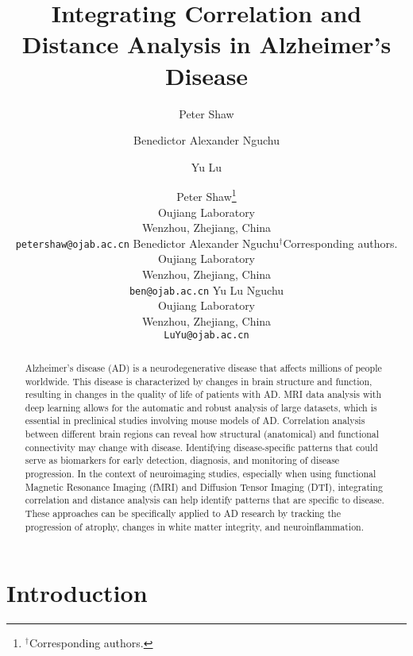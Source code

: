 \documentclass[twocolumn]{article}
\title{Integrating Correlation and Distance Analysis in Alzheimer's Disease}
\author[1,*]{Peter Shaw}%
\author[1,*]{Benedictor Alexander Nguchu}
\author[1]{Yu Lu}
\affil[1]{Oujiang Laboratory, Wenzhou, Zhejiang, China\\ 
}
\affil[*]{Corresponding author: Peter Shaw, \texttt{petershaw@ojlab.ac.cn}}
\author{
    Peter Shaw\thanks{$^{\dag}$Corresponding authors.}\\
    Oujiang Laboratory\\ 
    Wenzhou, Zhejiang, China\\ 
    \texttt{petershaw@ojab.ac.cn}
  \And 
    Benedictor Alexander Nguchu{$^{\dag}$Corresponding authors.}\\
    Oujiang Laboratory\\ 
    Wenzhou, Zhejiang, China\\ 
    \texttt{ben@ojab.ac.cn}
  \And 
    Yu Lu Nguchu\\
    Oujiang Laboratory\\ 
    Wenzhou, Zhejiang, China\\ 
    \texttt{LuYu@ojab.ac.cn}
    
}
\begin{document}
\maketitle

\begin{abstract}
Alzheimer's disease (AD) is a neurodegenerative disease that affects millions of people worldwide. This disease is characterized by changes in brain structure and function, resulting in changes in the quality of life of patients with AD. MRI data analysis with deep learning allows for the automatic and robust analysis of large datasets, which is essential in preclinical studies involving mouse models of AD. Correlation analysis between different brain regions can reveal how structural (anatomical) and functional connectivity may change with disease. Identifying disease-specific patterns that could serve as biomarkers for early detection, diagnosis, and monitoring of disease progression. In the context of neuroimaging studies, especially when using functional Magnetic Resonance Imaging (fMRI) and Diffusion Tensor Imaging (DTI), integrating correlation and distance analysis can help identify patterns that are specific to disease. These approaches can be specifically applied to AD research by tracking the progression of atrophy, changes in white matter integrity, and neuroinflammation.
\end{abstract}









\section{Introduction}


\end{document}
